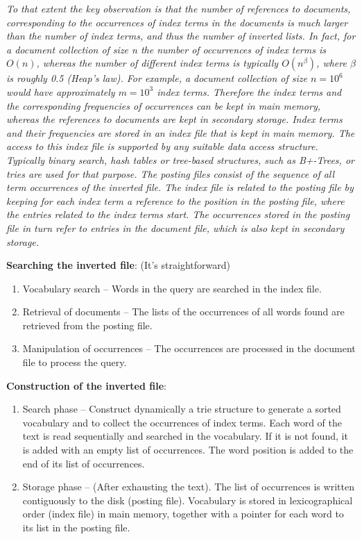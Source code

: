     \emph{To that extent the key observation is that the number of references to documents, corresponding to the occurrences of index terms in the documents is much larger than the number of index terms, and thus the number of inverted lists. In fact, for a document collection of size n the number of occurrences of index terms is $O(n)$, whereas the number of different index terms is typically $O(n^\beta)$, where $\beta$ is roughly 0.5 (Heap's law). For example, a document collection of size $n= 10^6$ would have approximately $m=10^3$ index terms. Therefore the index terms and the corresponding frequencies of occurrences can be kept in main memory, whereas the references to documents are kept in secondary storage. Index terms and their frequencies are stored in an index file that is kept in main memory. The access to this index file is supported by any suitable data access structure. Typically binary search, hash tables or tree-based structures, such as B+-Trees, or tries are used for that purpose. The posting files consist of the sequence of all term occurrences of the inverted file. The index file is related to the posting file by keeping for each index term a reference to the position in the posting file, where the entries related to the index terms start. The occurrences stored in the posting file in turn refer to entries in the document file, which is also kept in secondary storage.}

    \textbf{Searching the inverted file}: (It's straightforward)
    \begin{enumerate}
      \item Vocabulary search -- Words in the query are searched in the index file.
      \item Retrieval of documents -- The lists of the occurrences of all words found are retrieved from the posting file.
      \item Manipulation of occurrences -- The occurrences are processed in the document file to process the query.
    \end{enumerate}

    \textbf{Construction of the inverted file}:
    \begin{enumerate}
      \item Search phase -- Construct dynamically a trie structure to generate a sorted vocabulary and to collect the occurrences of index terms. Each word of the text is read sequentially and searched in the vocabulary. If it is not found, it is added with an empty list of occurrences. The word position is added to the end of its list of occurrences.
      \item Storage phase -- (After exhausting the text). The list of occurrences is written contiguously to the disk (posting file). Vocabulary is stored in lexicographical order (index file) in main memory, together with a pointer for each word to its list in the posting file.
    \end{enumerate}


